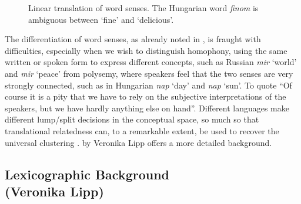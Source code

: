 \documentclass[11pt]{article}
\begin{document}
\begin{figure}[b]
    \centering
    \resizebox{\columnwidth}{!} {
    }
    \caption{Linear translation of word senses. The Hungarian word
        \emph{finom} is ambiguous between `fine' and `delicious'.}
        \label{fig:AdaGram}
\end{figure}

The differentiation of word senses, as already noted in \cite{Borbely:2016}, is
fraught with difficulties, especially when we wish to distinguish homophony,
using the same written or spoken form to express different concepts, such as
Russian {\it mir} `world' and {\it mir} `peace' from polysemy, where speakers
feel that the two senses are very strongly connected, such as in Hungarian {\it
nap} `day' and {\it nap} `sun'.  To quote \cite{Zgusta:1971} ``Of course it is
a pity that we have to rely on the subjective interpretations of the speakers,
but we have hardly anything else on hand''. %
Different languages make different lump/split decisions in the conceptual
space, so much so that translational relatedness can, to a remarkable extent,
be used to recover the universal clustering \citep{Youn:2016}.
 by Veronika Lipp offers a more detailed background.

\subsection{Lexicographic Background \\ (Veronika Lipp)}
\end{document}
